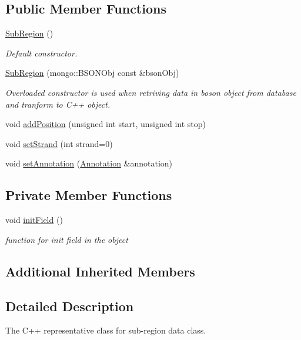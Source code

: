 \subsection*{Public Member Functions}
\begin{DoxyCompactItemize}
\item 
\hyperlink{classunisys_1_1SubRegion_a4d6441c4b5c82c82fa1b480d6360f5df}{Sub\-Region} ()
\begin{DoxyCompactList}\small\item\em Default constructor. \end{DoxyCompactList}\item 
\hyperlink{classunisys_1_1SubRegion_ad8352b3127f325cabfbb40eb744968bd}{Sub\-Region} (mongo\-::\-B\-S\-O\-N\-Obj const \&bson\-Obj)
\begin{DoxyCompactList}\small\item\em Overloaded constructor is used when retriving data in boson object from database and tranform to C++ object. \end{DoxyCompactList}\item 
void \hyperlink{classunisys_1_1SubRegion_a1d2a20adb4088337faced2847999b329}{add\-Position} (unsigned int start, unsigned int stop)
\item 
void \hyperlink{classunisys_1_1SubRegion_af9acab905fd9533bb053f86f539972f5}{set\-Strand} (int strand=0)
\item 
void \hyperlink{classunisys_1_1SubRegion_aeb33c5136705e179e0068052eda7a389}{set\-Annotation} (\hyperlink{classunisys_1_1Annotation}{Annotation} \&annotation)
\end{DoxyCompactItemize}
\subsection*{Private Member Functions}
\begin{DoxyCompactItemize}
\item 
void \hyperlink{classunisys_1_1SubRegion_abaff0ecac757200f5e4173a86054927e}{init\-Field} ()
\begin{DoxyCompactList}\small\item\em function for init field in the object \end{DoxyCompactList}\end{DoxyCompactItemize}
\subsection*{Additional Inherited Members}


\subsection{Detailed Description}
The C++ representative class for sub-\/region data class. 

